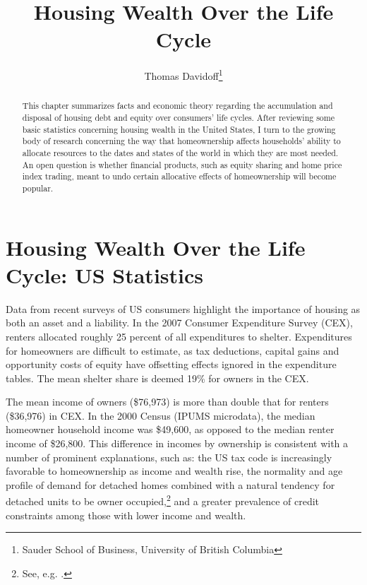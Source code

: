 \documentclass[12pt]{article}
\begin{document}
\title{Housing Wealth Over the Life Cycle}
\author{Thomas Davidoff\thanks{Sauder School of Business, University of British
Columbia}}
\maketitle

\begin{abstract}
This chapter summarizes facts and economic theory regarding the accumulation and
disposal of housing debt and equity over consumers' life cycles.  After
reviewing some basic statistics concerning housing wealth in the United States,
I turn to the growing body of research concerning the way that homeownership
affects households' ability to allocate resources to the dates and states of the
world in which they are most needed.  An open question is whether financial
products, such as equity sharing and home price index trading, meant to undo
certain allocative effects of homeownership will become popular.
\end{abstract}

\section{Housing Wealth Over the Life Cycle: US Statistics}

Data from recent surveys of US consumers highlight the importance of housing as
both an asset and a liability.  In the 2007 Consumer Expenditure Survey (CEX),
renters allocated roughly 25 percent of all expenditures to shelter.
Expenditures for homeowners are difficult to estimate, as tax deductions,
capital gains and opportunity costs of equity have offsetting effects ignored in
the expenditure tables.  The mean shelter share is deemed 19\% for owners in the
CEX.

The mean income of owners (\$76,973) is more than double that for renters
(\$36,976) in CEX.  In the 2000 Census (IPUMS microdata), the median homeowner
household income was \$49,600, as opposed to the median renter income of
\$26,800. This difference in incomes by ownership is consistent with a number of
prominent explanations, such as: the US tax code is increasingly favorable to
homeownership as income and wealth rise, the normality and age profile of demand
for detached homes combined with a natural tendency for detached units to be
owner occupied,\footnote{See, e.g. \citet{GlaeserShapiro}.} and a greater
prevalence of credit constraints among those with lower income and wealth.
\end{document}

